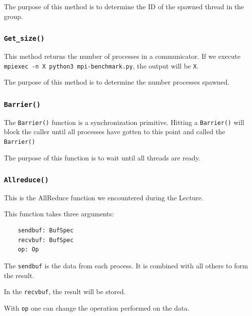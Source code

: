 \documentclass{article}
\begin{document}
    The purpose of this method is to determine the ID of the spawned thread in the group.

    \subsubsection{\texttt{Get\_size()}}
    This method returns the number of processes in a communicator. If we execute \\\verb|mpiexec -n X python3 mpi-benchmark.py|, the output will be \verb|X|.

    The purpose of this method is to determine the number processes spawned.

    \subsubsection{\texttt{Barrier()}}
    The \texttt{Barrier()} function is a synchronization primitive. Hitting a \texttt{Barrier()} will block the caller until all processes have gotten to this point and called the \texttt{Barrier()}

    The purpose of this function is to wait until all threads are ready.

    \subsubsection{\texttt{Allreduce()}}
    This is the AllReduce function we encountered during the Lecture.

    This function takes three arguments:
    \begin{verbatim}
    sendbuf: BufSpec
    recvbuf: BufSpec
    op: Op\end{verbatim}
    
    The \texttt{sendbuf} is the data from each process. It is combined with all others to form the result.

    In the \texttt{recvbuf}, the result will be stored. 

    With \texttt{op} one can change the operation performed on the data. 
    

    





    
\end{document}
